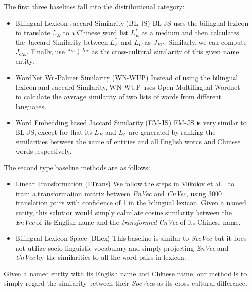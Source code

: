 The first three baselines fall into the distributional category:
\begin{itemize}
	\item {Bilingual Lexicon Jaccard Similarity (BL-JS)}
 BL-JS uses the bilingual lexicon to translate $L_E$  to a Chinese word list $L_E^*$ as a medium and then calculates the Jaccard Similarity between $L_E^*$ and $L_C$ as $J_{EC}$. Similarly, we can compute $J_{CE}$. Finally, use $\frac{J_{EC}+J_{CE}}{2}$ as the cross-cultural similarity of this given name entity.
	\item {WordNet Wu-Palmer Similarity (WN-WUP)} 
	Instead of using the bilingual lexicon and Jaccard Similarity, WN-WUP uses Open Multilingual Wordnet~\cite{wang2013building,bond2013linking} to calculate the average similarity of two lists of words from different languages.
	\item {Word Embedding based Jaccard Similarity (EM-JS)}
	EM-JS is very similar to BL-JS, except for that its $L_E$ and $L_C$ are generated by ranking the similarities between the name of entities and all English words and Chinese words respectively. 
\end{itemize}

The second type baseline methods are as follows:
\begin{itemize}
	\item {Linear Transformation (LTrans)}
	We follow the steps in Mikolov et al.~ to train a transformation matrix between \textit{EnVec} and \textit{CnVec}, using 3000 translation pairs with confidence of 1 in the bilingual lexicon. Given a named entity, this solution would simply calculate cosine similarity between the \textit{EnVec} of its English name and the \textit{transformed} \textit{CnVec} of its Chinese name. 
	\item {Bilingual Lexicon Space (BLex)}
		This baseline is similar to \textit{SocVec} but it does not utilize socio-linguistic vocabulary and simply projecting \textit{EnVec} and \textit{CnVec} by the similarities to all the word pairs in lexicon.
\end{itemize}

Given a named entity with its English name and Chinese name, our method is to simply regard the similarity between their \textit{SocVec}s as its cross-cultural difference. 

